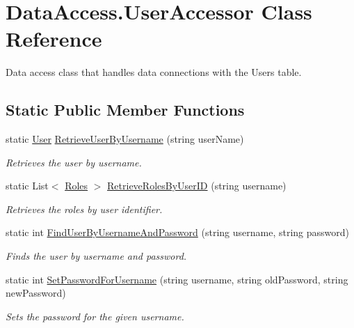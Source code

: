 \hypertarget{class_data_access_1_1_user_accessor}{}\section{Data\+Access.\+User\+Accessor Class Reference}
\label{class_data_access_1_1_user_accessor}


Data access class that handles data connections with the Users table.  


\subsection*{Static Public Member Functions}
\begin{DoxyCompactItemize}
\item 
static \hyperlink{class_business_objects_1_1_user}{User} \hyperlink{class_data_access_1_1_user_accessor_a72f9e01c595f36043a8ba0801836ac11}{Retrieve\+User\+By\+Username} (string user\+Name)
\begin{DoxyCompactList}\small\item\em Retrieves the user by username. \end{DoxyCompactList}\item 
static List$<$ \hyperlink{class_business_objects_1_1_roles}{Roles} $>$ \hyperlink{class_data_access_1_1_user_accessor_a452e243ca11dd46f9b5c82daf1b19742}{Retrieve\+Roles\+By\+User\+ID} (string username)
\begin{DoxyCompactList}\small\item\em Retrieves the roles by user identifier. \end{DoxyCompactList}\item 
static int \hyperlink{class_data_access_1_1_user_accessor_a47c06dec23dd7b81b6dad6b1c3a55259}{Find\+User\+By\+Username\+And\+Password} (string username, string password)
\begin{DoxyCompactList}\small\item\em Finds the user by username and password. \end{DoxyCompactList}\item 
static int \hyperlink{class_data_access_1_1_user_accessor_acc5b572bb1f5a1073fbe5cfeb0096b65}{Set\+Password\+For\+Username} (string username, string old\+Password, string new\+Password)
\begin{DoxyCompactList}\small\item\em Sets the password for the given username. \end{DoxyCompactList}\item 

\end{DoxyCompactItemize}
